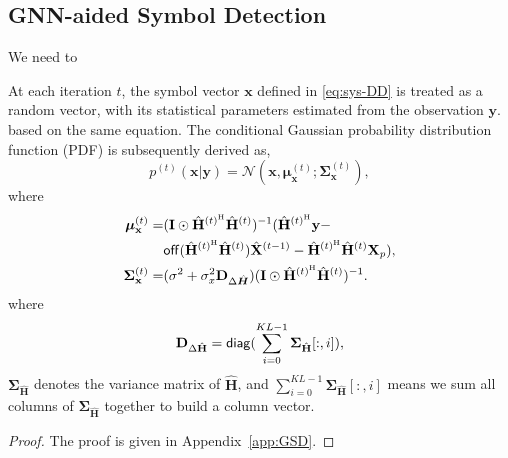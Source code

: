\documentclass[journal]{IEEEtran}
\newcommand{\HT}{^{\mathrm{H}}} %
\newcommand{\diag}{{\sf diag}} %
\newcommand{\off}{{\sf off}} %
\begin{document}

\subsection{GNN-aided Symbol Detection}
We need to 

At each iteration $t$, the symbol vector $\bm{x}$ defined in \eqref{eq:sys-DD} is treated as a random vector, with its statistical parameters estimated from the observation $\bm{y}$. based on the same equation. The conditional Gaussian probability distribution function (PDF) is subsequently derived as,
\begin{equation}
p^{(t)}(\mathbf x|\mathbf y) = \mathcal{N}(\mathbf x, \bm \mu_{\mathbf x}^{(t)}; \bm\Sigma_{\mathbf x}^{(t)}),
\end{equation}
where
\begin{subequations}
\begin{align}
\bm\mu_{\mathbf x}^{(t)} =& (\mathbf  I\odot\hat{\mathbf  H}^{(t)\HT} \hat{\mathbf  H}^{(t)})^{-1}(\hat{\mathbf H}^{(t)\HT}\mathbf y - \notag\\
& \off(\hat{\mathbf  H}^{(t)\HT} \hat{\mathbf H}^{(t)})\hat{\mathbf X}^{(t-1)} - \hat{\mathbf H}^{(t)\HT} \hat{\mathbf H}^{(t)}\mathbf X_p), \label{eq:GSD-mean} \\
\bm\Sigma_{\mathbf x}^{(t)} =& (\sigma^2 + \sigma_x^2 \mathbf D_{\Delta \hat{\bm H}})(\mathbf I\odot\hat{\mathbf H}^{(t)\HT} \hat{\mathbf H}^{(t)})^{-1}. \label{eq:GSD-cov} 
\end{align}
\end{subequations}
where
\begin{equation}
\mathbf D_{\Delta \hat{\mathbf H}} = \diag(\sum_{i=0}^{KL-1}\bm \Sigma_{\hat{\mathbf H}}[:, i]),
\end{equation}
$\bm\Sigma_{\hat{\mathbf H}}$ denotes the variance matrix of $\hat{\mathbf H}$, and $\sum_{i=0}^{KL-1}\bm \Sigma_{\hat{\mathbf H}}[:, i]$ means we sum all columns of $\bm\Sigma_{\hat{\mathbf H}}$ together to build a column vector.

\begin{proof}
The proof is given in Appendix~\ref{app:GSD}.
\end{proof}

\end{document}

